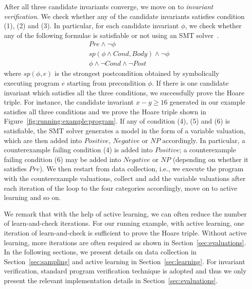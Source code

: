 After all three candidate invariants converge, we move on to \emph{invariant verification}. We check whether any of the candidate invariants satisfies condition (1), (2) and (3). In particular, for each candidate invariant $\phi$, we check whether any of the following formulae is satisfiable or not using an SMT solver~\cite{barrett2009satisfiability,de2008z3}.
\begin{align}
    & \mathit{Pre} \land \neg \phi \label{check:inv:pre} \\
     & sp(\phi \land \mathit{Cond}, \mathit{Body}) \land \neg \phi \label{check:inv:loop} \\
    & \phi \land \neg \mathit{Cond} \land \neg \mathit{Post} \label{check:inv:post}
\end{align}
where $sp(\phi,e)$ is the strongest postcondition obtained by
symbolically executing program $e$
starting from precondition $\phi$.
If there is one candidate invariant which satisfies all the three conditions, we successfully prove the Hoare triple. For instance, the candidate invariant $x - y \geq 16$ generated in our example satisfies all three conditions and we prove the Hoare triple shown in Figure~\ref{fig:running:example:program}. If any of condition (4), (5) and (6) is satisfiable, the SMT solver generates a model in the form of a variable valuation, which are then added into $Positive$, $Negative$ or $NP$ accordingly. In particular, a counterexample failing condition (4) is added into $Positive$; a counterexample failing condition (6) may be added into $Negative$ or $NP$ (depending on whether it satisfies $Pre$). We then restart from data collection, i.e., we execute the program with the counterexample valuations, collect and add the variable valuations after each iteration of the loop to the four categories accordingly, move on to active learning and so on.

We remark that with the help of active learning, we can often reduce the number of learn-and-check iterations. For our running example, with active learning, one iteration of learn-and-check is sufficient to prove the Hoare triple. Without active learning, more iterations are often required as shown in Section~\ref{sec:evaluations}. In the following sections, we present details on data collection in Section~\ref{sec:sampling} and active learning in Section~\ref{sec:learning}. For invariant verification, standard program verification technique is adopted and thus we only present the relevant implementation details in Section~\ref{sec:evaluations}.

